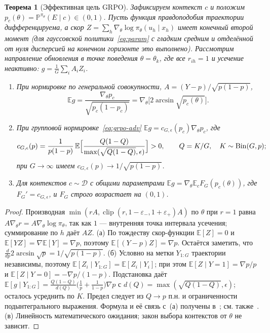 \documentclass[11pt,a4paper]{article}
\theoremstyle{plain}
\newtheorem{theorem}{Теорема}[section]
\theoremstyle{definition}
\theoremstyle{remark}
\newcommand{\E}{\mathbb{E}}
\newcommand{\PP}{\mathbb{P}}
\DeclareMathOperator{\clip}{clip}
\newcommand{\cD}{\mathcal{D}}
\begin{document}
\begin{theorem}[Эффективная цель GRPO]\label{thm:arcsin}
Зафиксируем контекст $c$ и положим $p_c(\theta)=\PP^{\pi_\theta}(E\mid c)\in(0,1)$. Пусть функция правдоподобия траектории дифференцируема, а скор $Z=\sum_h\nabla_\theta\log\pi_\theta(u_h\mid x_h)$ имеет конечный второй момент (для гауссовской политики~\eqref{eq:param} с гладким средним и отделённой от нуля дисперсией на конечном горизонте это выполнено). Рассмотрим направление обновления в точке поведения $\theta=\theta_k$, где все $r_{ih}=1$ и усечение неактивно: $g=\frac1G\sum_iA_iZ_i$.
\begin{enumerate}[label=(\alph*)]
\item При нормировке по генеральной совокупности, $A=(Y-p)/\sqrt{p(1-p)}$,
\[
\E g=\frac{\nabla_\theta p_c}{\sqrt{p_c(1-p_c)}}=\nabla_\theta\bigl[2\arcsin\sqrt{p_c(\theta)}\bigr].
\]
\item При групповой нормировке~\eqref{eq:grpo-adv} $\E g=c_{G,\epsilon}(p_c)\nabla_\theta p_c$, где
\[
c_{G,\epsilon}(p)=\frac{1}{p(1-p)}\,\E\Bigl[\frac{Q(1-Q)}{\max(\sqrt{Q(1-Q)},\epsilon)}\Bigr]>0,\qquad Q=K/G,\quad K\sim\mathrm{Bin}(G,p);
\]
при $G\to\infty$ имеем $c_{G,\epsilon}(p)\to1/\sqrt{p(1-p)}$.
\item Для контекстов $c\sim\cD$ с общими параметрами $\E g=\nabla_\theta\E_cF_G(p_c(\theta))$, где $F_G'=c_{G,\epsilon}$, и $F_G$ строго возрастает на $(0,1)$.
\end{enumerate}
\end{theorem}
\begin{proof}
Производная $\min(rA,\clip(r,1-\varepsilon_-,1+\varepsilon_+)A)$ по $\theta$ при $r=1$ равна $A\nabla_\theta r=A\nabla_\theta\log\pi_\theta$, так как $1$ --- внутренняя точка интервала усечения; суммирование по $h$ даёт $AZ$.
(а) По тождеству скор-функции $\E[Z]=0$ и $\E[YZ]=\nabla\E[Y]=\nabla p$, поэтому $\E[(Y-p)Z]=\nabla p$. Остаётся заметить, что $\frac{d}{dp}2\arcsin\sqrt p=1/\sqrt{p(1-p)}$.
(б) Условно на метки $Y_{1:G}$ траектории независимы, поэтому $\E[Z_i\mid Y_{1:G}]=\E[Z_i\mid Y_i]$; при этом $\E[Z\mid Y=1]=\nabla p/p$ и $\E[Z\mid Y=0]=-\nabla p/(1-p)$. Подстановка даёт
$\E[g\mid Y_{1:G}]=\frac{Q(1-Q)}{d(Q)}\bigl(\frac1p+\frac1{1-p}\bigr)\nabla p$ с $d(Q)=\max(\sqrt{Q(1-Q)},\epsilon)$; осталось усреднить по $K$. Предел следует из $Q\to p$ п.н. и ограниченности подынтегрального выражения. Формула и её связь с~(а) получены в~\cite{notes}; см. также~\cite{mroueh}.
(в) Линейность математического ожидания; закон выбора контекстов от $\theta$ не зависит.
\end{proof}
\end{document}
